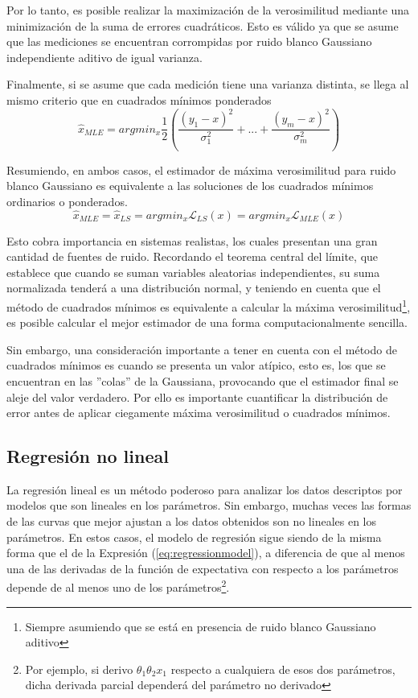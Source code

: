 Por lo tanto, es posible realizar la maximización de la verosimilitud mediante una minimización de la suma de errores cuadráticos. Esto es válido ya que se asume que las mediciones se encuentran corrompidas por ruido blanco Gaussiano independiente aditivo de igual varianza.

Finalmente, si se asume que cada medición tiene una varianza distinta, se llega al mismo criterio que en cuadrados mínimos ponderados
\begin{equation}
    \hat{x}_{MLE} = argmin_x \frac{1}{2}\left(\frac{(y_1-x)^2}{\sigma_1^2}+...+\frac{(y_m-x)^2}{\sigma_m^2}\right)
\end{equation}

Resumiendo, en ambos casos, el estimador de máxima verosimilitud para ruido blanco Gaussiano es equivalente a las soluciones de los cuadrados mínimos ordinarios o ponderados.
\begin{equation}
    \hat{x}_{MLE} = \hat{x}_{LS} = argmin_x\mathscr{L}_{LS}(x) = argmin_x\mathscr{L}_{MLE}(x)
\end{equation}

Esto cobra importancia en sistemas realistas, los cuales presentan una gran cantidad de fuentes de ruido. Recordando el teorema central del límite, que establece que cuando se suman variables aleatorias independientes, su suma normalizada tenderá a una distribución normal, y teniendo en cuenta que el método de cuadrados mínimos es equivalente a calcular la máxima verosimilitud\footnote{Siempre asumiendo que se está en presencia de ruido blanco Gaussiano aditivo}, es posible calcular el mejor estimador de una forma computacionalmente sencilla.

Sin embargo, una consideración importante a tener en cuenta con el método de cuadrados mínimos es cuando se presenta un valor atípico, esto es, los que se encuentran en las ''colas'' de la Gaussiana, provocando que el estimador final se aleje del valor verdadero. Por ello es importante cuantificar la distribución de error antes de aplicar ciegamente máxima verosimilitud o cuadrados mínimos.

\subsection{Regresión no lineal}

La regresión lineal es un método poderoso para analizar los datos descriptos por modelos que son lineales en los parámetros. Sin embargo, muchas veces las formas de las curvas que mejor ajustan a los datos obtenidos son no lineales en los parámetros. En estos casos, el modelo de regresión sigue siendo de la misma forma que el de la Expresión (\ref{eq:regressionmodel}), a diferencia de que al menos una de las derivadas de la función de expectativa con respecto a los parámetros depende de al menos uno de los parámetros\footnote{Por ejemplo, si derivo $\theta_1 \theta_2 x_1$ respecto a cualquiera de esos dos parámetros, dicha derivada parcial dependerá del parámetro no derivado}.

